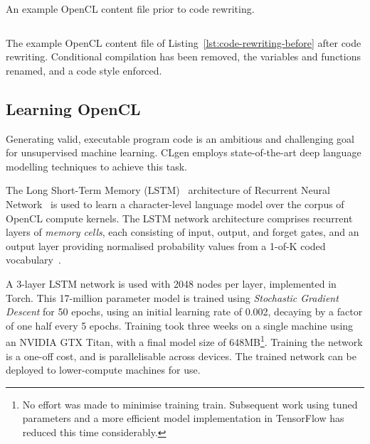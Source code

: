 \begin{listing}
  \inputminted{opencl_lexer.py:OpenCLLexer -x}{lst/clgen-rewrite-before.cl}
  \caption[Example OpenCL content file from GitHub]{An example OpenCL content file prior to code rewriting.}
  \label{lst:code-rewriting-before}
\end{listing}

\begin{listing}
  \inputminted{opencl_lexer.py:OpenCLLexer -x}{lst/clgen-rewrite-after.cl}
  \caption[OpenCL content file after rewriting]{The example OpenCL content file of Listing~\ref{lst:code-rewriting-before} after code rewriting. Conditional compilation has been removed, the variables and functions renamed, and a code style enforced.}
  \label{lst:code-rewriting-after}
\end{listing}


\subsection{Learning OpenCL}
\label{sec:learning-opencl}

Generating valid, executable program code is an ambitious and challenging goal for unsupervised machine learning. CLgen employs state-of-the-art deep language modelling techniques to achieve this task.

The Long Short-Term Memory (LSTM)~\cite{Hochreiter1997} architecture of Recurrent Neural Network~\cite{Sundermeyer2012,Mikolov2015} is used to learn a character-level language model over the corpus of OpenCL compute kernels. The LSTM network architecture comprises recurrent layers of \emph{memory cells}, each consisting of input, output, and forget gates, and an output layer providing normalised probability values from a 1-of-K coded vocabulary~\cite{Graves2005}.

A 3-layer LSTM network is used with 2048 nodes per layer, implemented in Torch. This 17-million parameter model is trained using \textit{Stochastic Gradient Descent} for 50 epochs, using an initial learning rate of 0.002, decaying by a factor of one half every 5 epochs. Training took three weeks on a single machine using an NVIDIA GTX Titan, with a final model size of 648MB\footnote{No effort was made to minimise training train. Subsequent work using tuned parameters and a more efficient model implementation in TensorFlow has reduced this time considerably.}. Training the network is a one-off cost, and is parallelisable across devices. The trained network can be deployed to lower-compute machines for use.


